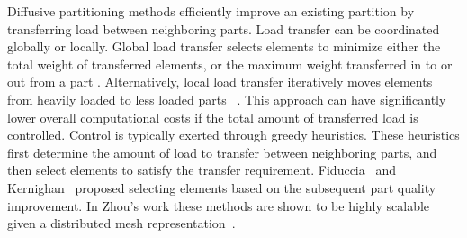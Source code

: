 Diffusive partitioning methods efficiently improve an existing partition
by transferring load between neighboring parts.
Load transfer can be coordinated globally or locally.
Global load transfer selects elements to minimize either the total
weight of transferred elements, or the maximum weight transferred in to or out
from a part
\cite{hu1999improved,Hu1998,meyerhenke2009graph,ou1994parallel,schloegel1997multilevel,schloegel2001wavefront,walshaw1995dynamic}.
Alternatively, local load transfer iteratively moves elements from heavily loaded to
less loaded parts
~\cite{subramanian1994analysis,cybenko1989dynamic,schloegel1997multilevel,willebeek1993strategies}.
This approach can have significantly lower overall computational costs if
the total amount of transferred load is controlled.
Control is typically exerted through greedy heuristics.
These heuristics first determine the amount of load to transfer between
neighboring parts, and then select elements to satisfy the transfer requirement.
Fiduccia~\cite{Fiduccia1982} and Kernighan~\cite{Kernighan1970} proposed
selecting elements based on the subsequent part quality improvement.
In Zhou's work these methods are shown to be highly scalable given a
distributed mesh representation~\cite{Zhou2010,zhou2012unstructured}.
